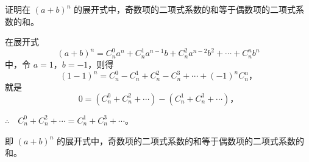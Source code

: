 \liti 证明在 $(a + b)^n$ 的展开式中，奇数项的二项式系数的和等于偶数项的二项式系数的和。

\zhengming 在展开式
$$ (a + b)^n = C_n^0 a^n + C_n^1 a^{n-1}b + C_n^2 a^{n-2}b^2 + \cdots + C_n^n b^n $$
中，令 $a = 1$，$b = -1$，则得
$$ (1 - 1)^n = C_n^0 - C_n^1 + C_n^2 - C_n^3 + \cdots + (-1)^n C_n^n \text{，} $$
就是
$$ 0 = (C_n^0 + C_n^2 + \cdots) - (C_n^1 + C_n^3 + \cdots) \text{，} $$

$\therefore \quad C_n^0 + C_n^2 + \cdots = C_n^1 + C_n^3 + \cdots$。

即 $(a + b)^n$ 的展开式中，奇数项的二项式系数的和等于偶数项的二项式系数的和。



\lianxi
\begin{xiaotis}




\end{xiaotis}

